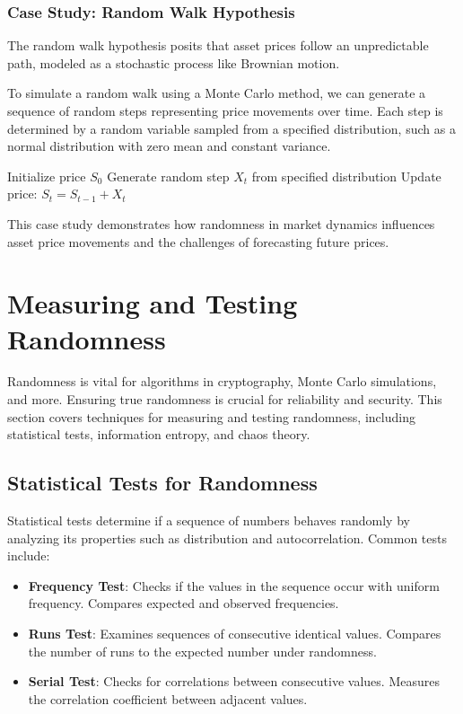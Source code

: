 \documentclass[12pt]{book} %
\begin{document}
\subsubsection{Case Study: Random Walk Hypothesis}
The random walk hypothesis posits that asset prices follow an unpredictable path, modeled as a stochastic process like Brownian motion.

To simulate a random walk using a Monte Carlo method, we can generate a sequence of random steps representing price movements over time. Each step is determined by a random variable sampled from a specified distribution, such as a normal distribution with zero mean and constant variance.

\FloatBarrier
\begin{algorithm}[H]
\caption{Random Walk Simulation}
\begin{algorithmic}[1]
\State Initialize price \(S_0\)
    \State Generate random step \(X_t\) from specified distribution
    \State Update price: \(S_t = S_{t-1} + X_t\)
\EndFor
\end{algorithmic}
\end{algorithm}
\FloatBarrier

This case study demonstrates how randomness in market dynamics influences asset price movements and the challenges of forecasting future prices.


\section{Measuring and Testing Randomness}
Randomness is vital for algorithms in cryptography, Monte Carlo simulations, and more. Ensuring true randomness is crucial for reliability and security. This section covers techniques for measuring and testing randomness, including statistical tests, information entropy, and chaos theory.

\subsection{Statistical Tests for Randomness}
Statistical tests determine if a sequence of numbers behaves randomly by analyzing its properties such as distribution and autocorrelation. Common tests include:

\begin{itemize}
    \item \textbf{Frequency Test}: Checks if the values in the sequence occur with uniform frequency. Compares expected and observed frequencies.
    
    \item \textbf{Runs Test}: Examines sequences of consecutive identical values. Compares the number of runs to the expected number under randomness.
    
    \item \textbf{Serial Test}: Checks for correlations between consecutive values. Measures the correlation coefficient between adjacent values.
\end{itemize}
\end{document}
